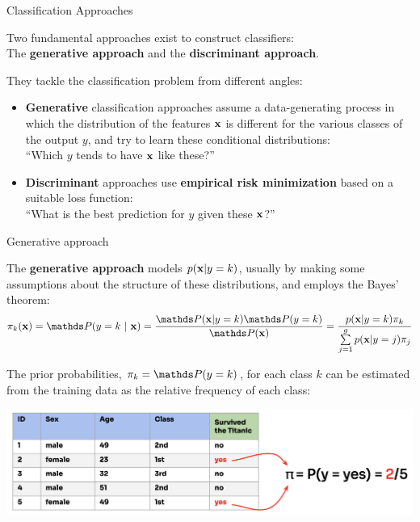 \documentclass[11pt,compress,t,notes=noshow, xcolor=table]{beamer}
\begin{document}
\begin{vbframe}{Classification Approaches}

  Two fundamental approaches exist to construct classifiers:\\
  The \textbf{generative approach} and the \textbf{discriminant approach}.

\lz
They tackle the classification problem from different angles:

\begin{itemize}
\item \textbf{Generative} classification approaches assume a data-generating process in which the distribution of the features $\mathbf{x}$ is different for the various classes of the output $y$, and try to learn these conditional distributions:\\ \enquote{Which $y$ tends to have $\mathbf{x}$ like these?}
\lz
\item \textbf{Discriminant} approaches use \textbf{empirical risk minimization} based on a suitable loss function:\\ \enquote{What is the best prediction for $y$ given these $\mathbf{x}$?}
\end{itemize}
\end{vbframe}

\begin{vbframe}{Generative approach}

The \textbf{generative approach}
models $p(\mathbf{x} | y= k)$, usually by making some assumptions about the structure of these distributions, and employs the Bayes' theorem:
$$\pikx = \postk = \frac{\P(\xv | y = k) \P(y = k)}{\P(\xv)} = \frac{\pdfxyk \pik}{\sumjg \pdfxyk[j] \pi_j}$$

The prior probabilities, $\pi_k = \P(y = k)$, for each class $k$ can be estimated from the training data as the relative frequency of each class:

\begin{center}
\includegraphics[width=\textwidth]{figure_man/prior_probabilities.png} 
\end{center}

\end{vbframe}
\end{document}
